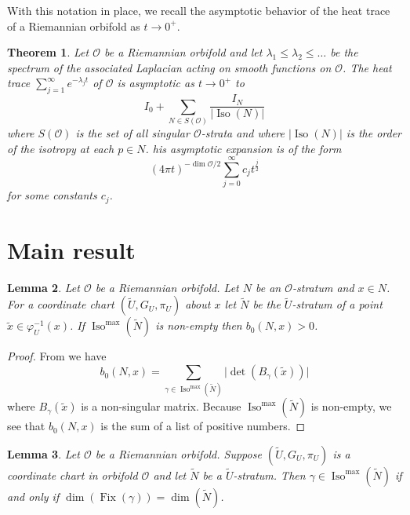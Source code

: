 \documentclass{amsart}
\theoremstyle{plain}
\newtheorem{thm}{Theorem}[section]
\newtheorem{lemma}[thm]{Lemma}
\theoremstyle{definition}
\theoremstyle{remark}
\newcommand{\myabs}[1]{\vert#1\vert}
\newcommand{\wtu}{\widetilde{U}}
\newcommand{\wtn}{\widetilde{N}}
\newcommand{\orb}{\mathcal O}
\DeclareMathOperator{\iso}{Iso}
\DeclareMathOperator{\fix}{Fix}
\begin{document}
With this notation in place, we recall the asymptotic behavior of the heat trace of a Riemannian orbifold as $t\rightarrow 0^+$.

\begin{thm}\cite[Theorem 4.8]{dggw} \label{hta} Let $\orb$ be a Riemannian orbifold and let $\lambda_1 \le \lambda_2 \le \dots $ be the spectrum of the associated Laplacian acting on smooth functions on $\orb$. The heat trace $\sum_{j=1}^{\infty}e^{-\lambda_{j} t}$ of $\orb$ is asymptotic as $t \rightarrow 0^+$ to
\[I_0+\sum_{N \in S(\mathcal{O})}\frac{I_N}{\myabs{\iso(N)}}\]
where $S(\orb)$ is the set of all singular $\orb$-strata and where
$\myabs{\iso(N)}$ is the order of the isotropy at each $p \in N$.
 his asymptotic expansion is of the form 
\[(4\pi t)^{-\dim{\orb}/2} \sum_{j=0}^\infty c_j t^{\tfrac{j}{2}}\]
for some constants $c_j$.
\end{thm}


\section{Main result}

\begin{lemma}\label{lem:b_0} Let $\orb$ be a Riemannian orbifold. Let $N$ be an $\orb$-stratum and $x\in N$. For a coordinate chart $(\widetilde{U}, G_U, \pi_U)$ about $x$ let $\widetilde{N}$ be the $\wtu$-stratum of a point $\tilde{x}\in \varphi_U^{-1}(x)$.  If $\iso^{\max}(\widetilde N)$ is non-empty then $b_0(N,x) > 0$.
\end{lemma}

\begin{proof} From \cite[p.16]{dggw} we have $$b_0(N,x) = \sum_{\gamma \in \iso^{\max}(\widetilde N)} \myabs{\det(B_\gamma(\tilde{x})) }$$
where $B_\gamma(\tilde{x})$ is a non-singular matrix.  Because $\iso^{\max}(\widetilde N)$ is non-empty, we see that $b_0(N,x)$ is the sum of a list of positive numbers.
\end{proof}

\begin{lemma}\label{lem:dim_of_fix} Let $\orb$ be a Riemannian orbifold. Suppose $(\widetilde{U}, G_U, \pi_U)$ is a coordinate chart in orbifold $\orb$ and let $\widetilde{N}$ be a $\widetilde{U}$-stratum.  Then $\gamma \in \iso^{\max}(\wtn)$ if and only if $\dim(\fix(\gamma)) = \dim(\widetilde{N})$.
\end{lemma}
\end{document}
